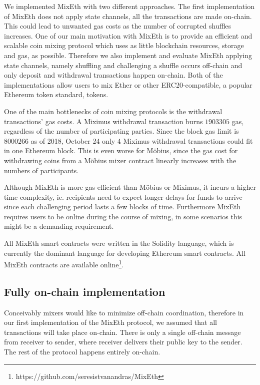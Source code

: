 \documentclass[a4paper,UKenglish,cleveref, autoref]{oasics-v2019}
\begin{document}
We implemented MixEth with two different approaches. The first implementation of MixEth does not apply state channels, all the transactions are made on-chain. This could lead to unwanted gas costs as the number of corrupted shuffles increases. One of our main motivation with MixEth is to provide an efficient and scalable coin mixing protocol which uses as little blockchain resources, storage and gas, as possible. Therefore we also implement and evaluate MixEth applying state channels, namely shuffling and challenging a shuffle occurs off-chain and only deposit and withdrawal transactions happen on-chain.
Both of the implementations allow users to mix Ether or other ERC20-compatible, a popular Ethereum token standard, tokens.

One of the main bottlenecks of coin mixing protocols is the withdrawal transactions' gas costs. A Miximus withdrawal transaction burns $\num[group-separator={,}]{1903305}$ gas, regardless of the number of participating parties. Since the block gas limit is $\num[group-separator={,}]{8000266}$ as of 2018, October 24 only 4 Miximus withdrawal transactions could fit in one Ethereum block. This is even worse for Möbius, since the gas cost for withdrawing coins from a Möbius mixer contract linearly increases with the numbers of participants.

Although MixEth is more gas-efficient than Möbius or Miximus, it incurs a higher time-complexity, ie. recipients need to expect longer delays for funds to arrive since each challenging period lasts a few blocks of time. Furthermore MixEth requires users to be online during the course of mixing, in some scenarios this might be a demanding requirement.

All MixEth smart contracts were written in the Solidity language, which is currently the dominant language for developing Ethereum smart contracts. All MixEth contracts are available online\footnote{https://github.com/seresistvanandras/MixEth}.  

\subsection{Fully on-chain implementation} \label{fullyonchainimpl}
Conceivably mixers would like to minimize off-chain coordination, therefore in our first implementation of the MixEth protocol, we assumed that all transactions will take place on-chain. There is only a single off-chain message from receiver to sender, where receiver delivers their public key to the sender. The rest of the protocol happens entirely on-chain.
\end{document}
